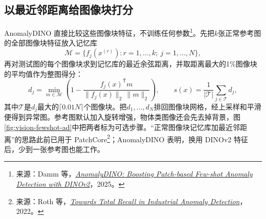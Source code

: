 \subsection{以最近邻距离给图像块打分}
AnomalyDINO 直接比较这些图像块特征，不训练任何参数\footnote{来源：Damm 等，\href{https://arxiv.org/abs/2405.14529}{\textit{AnomalyDINO: Boosting Patch-based Few-shot Anomaly Detection with DINOv2}}，2025。}。先把$k$张正常参考图的全部图像块特征放入记忆库
\begin{equation}
 \mathcal M=\{f_j(x^{(r)}):r=1,\ldots,k;\ j=1,\ldots,N\},
\end{equation}
再对测试图的每个图像块求到记忆库的最近余弦距离，并取距离最大的1\%图像块的平均值作为整图得分：
\begin{equation}
 d_j=\min_{m\in\mathcal M}\left(1-\frac{f_j(x)^{\mathsf T}m}{\|f_j(x)\|_2\,\|m\|_2}\right),\qquad
 s(x)=\frac1{|\mathcal T|}\sum_{j\in\mathcal T}d_j,
 \label{eq:vision-fewshot-score}
\end{equation}
其中$\mathcal T$是$d_j$最大的$\lceil0.01N\rceil$个图像块。把$d_1,\ldots,d_N$排回图像块网格，经上采样和平滑便得到异常图。参考图默认加入旋转增强，物体类图像还会先去掉背景，图\ref{fig:vision-fewshot-ad}中把两者标为可选步骤。“正常图像块记忆库加最近邻距离”的思路此前已用于 PatchCore\footnote{来源：Roth 等，\href{https://arxiv.org/abs/2106.08265}{\textit{Towards Total Recall in Industrial Anomaly Detection}}，2022。}；AnomalyDINO 表明，换用 DINOv2 特征后，少到一张参考图也能工作。

